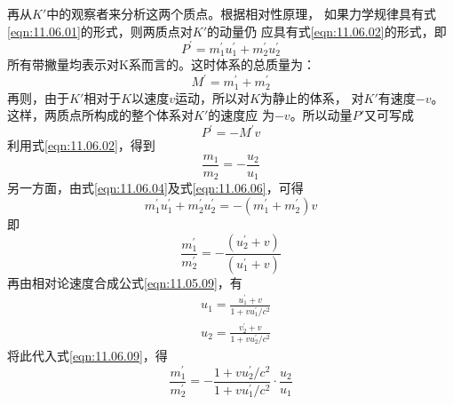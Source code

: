再从$ K ' $中的观察者来分析这两个质点。根据相对性原理，
如果力学规律具有式\eqref{eqn:11.06.01}的形式，则两质点对$ K ' $的动量仍
应具有式\eqref{eqn:11.06.02}的形式，即
\begin{equation}\label{eqn:11.06.04}
    P ^ { \prime } = m _ 1 ^ { \prime } u _ 1 ^ { \prime } + m _ 2 ^ { \prime } u _ 2 ^ { \prime }
\end{equation}
所有带撇量均表示对K系而言的。这时体系的总质量为：
\begin{equation}\label{eqn:11.06.05}
    M ^ { \prime } = m _ 1 ^ { \prime } + m _ 2 ^ { \prime }
\end{equation}
再则，由于$ K ' $相对于$ K $以速度$ v $运动，所以对$ K $为静止的体系，
对$ K ' $有速度$ -v $。这样，两质点所构成的整个体系对$ K ' $的速度应
为$ -v $。所以动量$ P ' $又可写成
\begin{equation}\label{eqn:11.06.06}
    P ^ { \prime } = - M ^ { \prime } v
\end{equation}
利用式\eqref{eqn:11.06.02}，得到
\begin{equation}\label{eqn:11.06.07}
    \frac { m _ { 1 } } { m _ { 2 } } = - \frac { u _ { 2 } } { u _ { 1 } }
\end{equation}
另一方面，由式\eqref{eqn:11.06.04}及式\eqref{eqn:11.06.06}，可得
\begin{equation}\label{eqn:11.06.08}
    m _ 1 ^ { \prime } u _ 1 ^ { \prime } + m _ 2 ^ { \prime } u _ 2 ^ { \prime } = - \left( m _ 1 ^ { \prime } + m _ 2 ^ { \prime } \right) v
\end{equation}
即\vspace{-1.56em}
\begin{equation}\label{eqn:11.06.09}
    \frac { m _ { 1 } ^ { \prime } } { m _ { 2 } ^ { \prime } } = - \frac { \left( u _ { 2 } ^ { \prime } + v \right) } { \left( u _ { 1 } ^ { \prime } + v \right) }
\end{equation}
再由相对论速度合成公式\eqref{eqn:11.05.09}，有
\begin{equation*}
    \begin{aligned}
        &u_{1}=\frac{u_{1}^{\prime}+v}{1+{v u_{1}^{\prime}}/{c^{2}}} \\
        &u_{2}=\frac{v_{2}^{\prime}+v}{1+{v u_{2}^{\prime}}/{c^{2}}}
    \end{aligned}
\end{equation*}
将此代入式\eqref{eqn:11.06.09}，得
\begin{equation*}
    \frac{m_{1}^{\prime}}{m_{2}^{\prime}}=-\frac{1+{v u_{2}^{\prime}}/{c^{2}}}{1+{v u_{1}^{\prime}}/{c^{2}}} \cdot \frac{u_{2}}{u_{1}}
\end{equation*}
